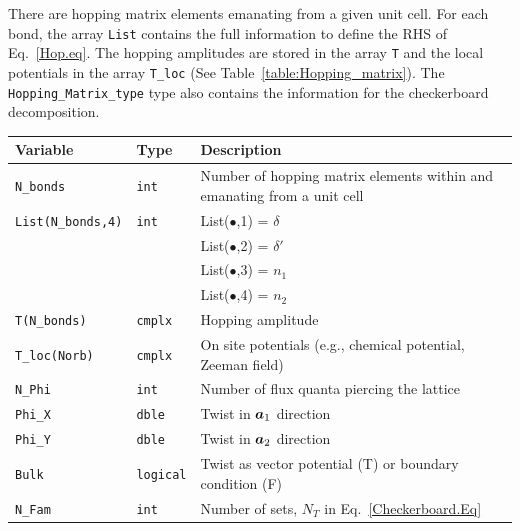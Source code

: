 There are     hopping   matrix  elements  emanating  from  a  given unit  cell. For  each bond,  the array 
\texttt{List}   contains the full  information to define the  RHS of Eq.~\eqref{Hop.eq}.    The hopping amplitudes are  stored in the  array  \texttt{T}  and the local potentials in the  array \texttt{T\_loc}   (See  Table~\ref{table:Hopping_matrix}).    The  \texttt{Hopping\_Matrix\_type}   type    also contains the information for the  checkerboard   decomposition.

\begin{table}[h]
	\begin{center}
		\begin{tabular}{@{} p{} @{} p{} p{} @{}}\toprule
			Variable                 & Type            & Description \\\midrule
			\texttt{N\_bonds}        & \texttt{int}    & Number of  hopping  matrix elements within and  emanating from   a unit cell   \\
			\texttt{List(N\_bonds,4)}& \texttt{int}    & List($\bullet$,1) =   $\delta$ \\
                                     &                 & List($\bullet$,2) =   $\delta'$ \\
                                     &                 & List($\bullet$,3) =   $n_1$     \\
                                     &                 & List($\bullet$,4) =   $n_2$     \\ 
			\texttt{T(N\_bonds)}     & \texttt{cmplx}  & Hopping amplitude   \\
			\texttt{T\_loc(Norb)}    & \texttt{cmplx}  & On site  potentials (e.g., chemical potential, Zeeman field)   \\
			\texttt{N\_Phi}          & \texttt{int}    & Number of  flux quanta piercing the lattice   \\
			\texttt{Phi\_X}          & \texttt{dble}   & Twist in $\boldsymbol{a}_1$  direction   \\
			\texttt{Phi\_Y}          & \texttt{dble}   & Twist in $\boldsymbol{a}_2$  direction   \\
			\texttt{Bulk}            & \texttt{logical}& Twist as vector potential (T) or  boundary condition (F)  \\
			\texttt{N\_Fam}          & \texttt{int}    & Number of  sets, $N_T$ in Eq.~\eqref{Checkerboard.Eq}   \\

\end{tabular}
\end{center}
\end{table}
